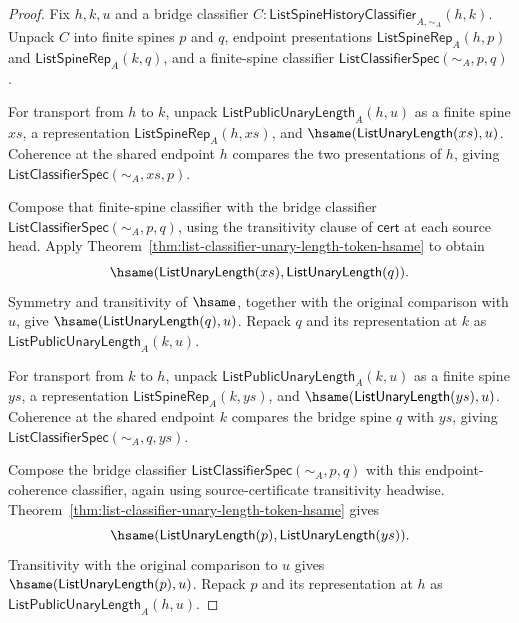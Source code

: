 \begin{proof}
Fix $h,k,u$ and a bridge classifier
$C:\mathsf{ListSpineHistoryClassifier}_{A,\sim_A}(h,k)$. Unpack $C$ into finite
spines $p$ and $q$, endpoint presentations
$\mathsf{ListSpineRep}_A(h,p)$ and $\mathsf{ListSpineRep}_A(k,q)$, and a
finite-spine classifier $\mathsf{ListClassifierSpec}(\sim_A,p,q)$.

For transport from $h$ to $k$, unpack
$\mathsf{ListPublicUnaryLength}_A(h,u)$ as a finite spine $xs$, a representation
$\mathsf{ListSpineRep}_A(h,xs)$, and
$\hsame(\mathsf{ListUnaryLength}(xs),u)$. Coherence at the shared endpoint $h$
compares the two presentations of $h$, giving
$\mathsf{ListClassifierSpec}(\sim_A,xs,p)$.

Compose that finite-spine classifier with the bridge classifier
$\mathsf{ListClassifierSpec}(\sim_A,p,q)$, using the transitivity clause of
$\mathsf{cert}$ at each source head. Apply
Theorem~\ref{thm:list-classifier-unary-length-token-hsame} to obtain
$$
\hsame(\mathsf{ListUnaryLength}(xs),\mathsf{ListUnaryLength}(q)).
$$
Symmetry and transitivity of $\hsame$, together with the original comparison
with $u$, give $\hsame(\mathsf{ListUnaryLength}(q),u)$. Repack $q$ and its
representation at $k$ as $\mathsf{ListPublicUnaryLength}_A(k,u)$.

For transport from $k$ to $h$, unpack
$\mathsf{ListPublicUnaryLength}_A(k,u)$ as a finite spine $ys$, a representation
$\mathsf{ListSpineRep}_A(k,ys)$, and
$\hsame(\mathsf{ListUnaryLength}(ys),u)$. Coherence at the shared endpoint $k$
compares the bridge spine $q$ with $ys$, giving
$\mathsf{ListClassifierSpec}(\sim_A,q,ys)$.

Compose the bridge classifier
$\mathsf{ListClassifierSpec}(\sim_A,p,q)$ with this endpoint-coherence
classifier, again using source-certificate transitivity headwise. Theorem~\ref{thm:list-classifier-unary-length-token-hsame}
gives
$$
\hsame(\mathsf{ListUnaryLength}(p),\mathsf{ListUnaryLength}(ys)).
$$
Transitivity with the original comparison to $u$ gives
$\hsame(\mathsf{ListUnaryLength}(p),u)$. Repack $p$ and its representation at
$h$ as $\mathsf{ListPublicUnaryLength}_A(h,u)$.
\end{proof}

